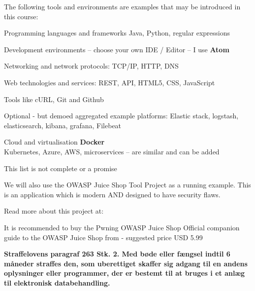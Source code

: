 \documentclass[Screen16to9,17pt]{foils}
\begin{document}
The following tools and environments are examples that may be introduced in this course:

\begin{list2}
\item Programming languages and frameworks Java, Python, regular expressions
\item Development environments -- choose your own IDE / Editor -- I use {\bf Atom}
\item Networking and network protocols: TCP/IP, HTTP, DNS
\item Web technologies and services: REST, API, HTML5, CSS, JavaScript
\item Tools like cURL, Git and Github
\item Optional - but demoed aggregated example platforms: Elastic stack, logstash, elasticsearch, kibana, grafana, Filebeat
\item Cloud and virtualisation {\bf Docker}\\
Kubernetes, Azure, AWS, microservices -- are similar and can be added
\end{list2}

\centerline{This list is not complete or a promise }





We will also use the OWASP Juice Shop Tool Project as a running example. This is an application which is modern AND designed to have security flaws.

Read more about this project at: \\ 

It is recommended to buy the Pwning OWASP Juice Shop Official companion guide to the OWASP Juice Shop from  - suggested price USD 5.99



\vskip 1cm
{\bfseries Straffelovens paragraf 263 Stk. 2. Med bøde eller fængsel
  indtil 6 måneder
straffes den, som uberettiget skaffer sig adgang til en andens
oplysninger eller programmer, der er bestemt til at bruges i et anlæg
til elektronisk databehandling.}
\end{document}
